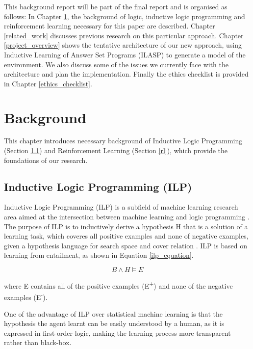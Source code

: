 \documentclass[12pt,twoside]{report}
\begin{document}
This background report will be part of the final report and is organised as follows: In Chapter \ref{background}, the background of logic, inductive logic programming and reinforcement learning necessary for this paper are described. Chapter \ref{related_work} discusses previous research on this particular approach. Chapter \ref{project_overview} shows the tentative architecture of our new approach, using Inductive Learning of Answer Set Programs (ILASP) to generate a model of the environment. We also discuss some of the issues we currently face with the architecture and plan the implementation. Finally the ethics checklist is provided in Chapter \ref{ethics_checklist}.

\chapter{Background}
\label{background}

This chapter introduces necessary background of Inductive Logic Programming (Section \ref{ilp}) and Reinforcement Learning (Section \ref{rl}), which provide the foundations of our research.

\section{Inductive Logic Programming (ILP)}
\label{ilp}

Inductive Logic Programming (ILP) is a subfield of machine learning research area aimed at the intersection between machine learning and logic programming \cite{Muggleton1991}. The purpose of ILP is to inductively derive a hypothesis H that is a solution of a learning task, which coveres all positive examples and none of negative examples, given a hypothesis language for search space and cover relation \cite{DeRaedt1997}. ILP is based on learning from entailment, as shown in Equation \ref{ilp_equation}.

\begin{equation}
B \wedge H \models E
\end{equation}
\label{ilp_equation}

where E contains all of the positive examples (E\textsuperscript{+}) and none of the negative examples (E\textsuperscript{-}).

One of the advantage of ILP over statistical machine learning is that the hypothesis the agent learnt can be easily understood by a human, as it is expressed in first-order logic, making the learning process more transparent rather than black-box.
\end{document}
